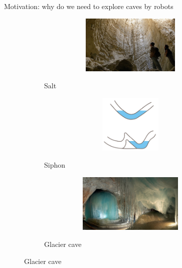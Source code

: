 \documentclass[aspectratio=169,xcolor=table]{beamer}
\begin{document}
\begin{frame}[t]{Motivation: why do we need to explore caves by robots}
    \vspace{-0.85cm}
    \begin{figure}[H]
        \begin{subfigure}[b]{0.3\textwidth}
            \centering\includegraphics[height=2.8cm,width=1\textwidth,keepaspectratio]{surface_types/salt.jpg}\\
            \caption*{Salt}
            \label{fig:salt}
        \end{subfigure}
        \hfill
        \begin{subfigure}[b]{0.3\textwidth}
            \centering\includegraphics[height=2.8cm,width=1\textwidth,keepaspectratio]{surface_types/siphon.png}\\
            \caption*{Siphon}
            \label{fig:siphon}
        \end{subfigure}
        \hfill
        \begin{subfigure}[b]{0.3\textwidth}
            \centering\includegraphics[height=2.8cm,width=1\textwidth,keepaspectratio]{surface_types/ice.png}\\
            \caption*{Glacier cave}
            \label{fig:ice}
        \end{subfigure}


\end{figure}
\end{frame}
\end{document}
